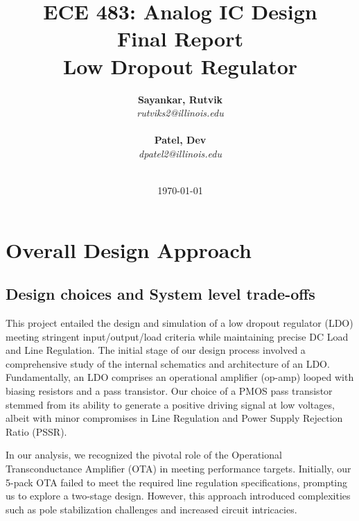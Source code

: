 \documentclass{report}
\title{ECE 483: Analog IC Design \\ Final Report \\ Low Dropout Regulator} %
\author {
    \textbf{Sayankar, Rutvik}\\
    \textit{rutviks2@illinois.edu} \\
    \hfill \\ 
    \textbf{Patel, Dev}\\
    \textit{dpatel2@illinois.edu} \\
    \hfill \\ 
}
\date{\today} %
\begin{document}
    \maketitle %
    
    \pagebreak


    \chapter{Overall Design Approach}
    \section{Design choices and System level trade-offs}
    This project entailed the design and simulation of a low dropout regulator (LDO) meeting stringent input/output/load criteria while maintaining precise DC Load and Line Regulation. The initial stage of our design process involved a comprehensive study of the internal schematics and architecture of an LDO. Fundamentally, an LDO comprises an operational amplifier (op-amp) looped with biasing resistors and a pass transistor. Our choice of a PMOS pass transistor stemmed from its ability to generate a positive driving signal at low voltages, albeit with minor compromises in Line Regulation and Power Supply Rejection Ratio (PSSR).

    In our analysis, we recognized the pivotal role of the Operational Transconductance Amplifier (OTA) in meeting performance targets. Initially, our 5-pack OTA failed to meet the required line regulation specifications, prompting us to explore a two-stage design. However, this approach introduced complexities such as pole stabilization challenges and increased circuit intricacies.
   
\end{document}
